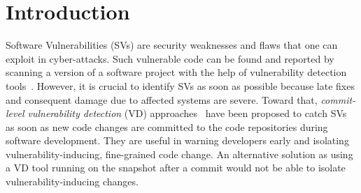 \section{Introduction}
\label{intro:sec}


Software Vulnerabilities (SVs) are security weaknesses and flaws that one can exploit in cyber-attacks.
Such vulnerable code can be found and reported by scanning a version of a software project with the help of vulnerability detection tools~\cite{li2018vuldeepecker,zhou2019devign,li2021sysevr}.
However, it is crucial to identify SVs as
soon as possible because late fixes and consequent damage due to affected systems are severe.
Toward that, {\em commit-level vulnerability
  detection} (VD)
approaches~\cite{perl2015vccfinder,zhou2017automated,chen2019large}
have been proposed to catch SVs as soon as new code changes are
committed to the code repositories during
software development. They are useful in warning developers early and
isolating vulnerability-inducing, fine-grained code change.
An alternative solution as using a VD tool running on the
snapshot after a commit would not be able to isolate 
vulnerability-inducing changes.




